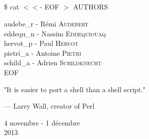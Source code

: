 \begin{titlepage}
    \begin{center}
        \textsc{\Large \reportsubject}\\[0.5cm]
        \HRule \\[0.4cm]
        {\huge \bfseries \reporttitle}\\[0.4cm]
        \HRule \\[1.5cm]
        \begin{minipage}[t]{0.8\textwidth}
                \huge \$ cat $<<$- EOF $>$ AUTHORS
        \end{minipage}

        \bigskip

        \begin{minipage}[t]{0.6\textwidth}
            \begin{flushleft} \large
                audebe\_r - Rémi \textsc{Audebert} \\
                eddequ\_n - Nassim \textsc{Eddequiouaq} \\
                hervot\_p - Paul \textsc{Hervot} \\
                pietri\_a - Antoine \textsc{Pietri} \\
                schild\_a - Adrien \textsc{Schildknecht} \\
                EOF \\
            \end{flushleft}
        \end{minipage}
        \vfill

        \epigraph{
        "It is easier to port a shell than a shell script."}{--- \textup{Larry
        Wall}, creator of Perl}

        {\large 4 novembre - 1 décembre \\ 2013}

    \end{center}

\end{titlepage}

